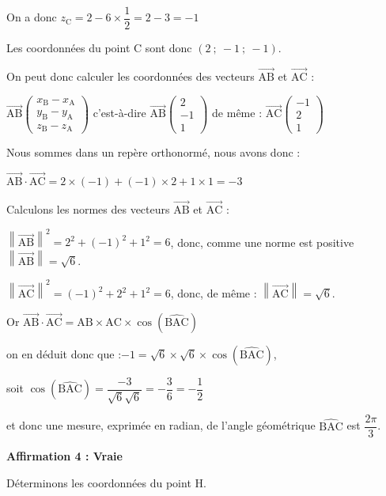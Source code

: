 \documentclass[10pt]{article}
\providecommand{\vect}[1]{\overrightarrow{#1}}
\begin{document}
On a donc $z_{\mathrm{C}}=2- 6\times \dfrac{1}{2}= 2-3=-1$

Les coordonnées du point C sont donc $(2~;~-1~;~-1)$.

On peut donc calculer les coordonnées des vecteurs $\vect{\mathrm{AB}}$ et $\vect{\mathrm{AC}}$ : 

$\vect{\mathrm{AB}}\begin{pmatrix}x_\mathrm{B} -x_\mathrm{A} \\ y_\mathrm{B}-y_\mathrm{A}\\z_\mathrm{B}-z_\mathrm{A}\end{pmatrix}$ c'est-à-dire $\vect{\mathrm{AB}}\begin{pmatrix}2 \\ -1\\1\end{pmatrix}$ 
\quad de même : $\vect{\mathrm{AC}}\begin{pmatrix}-1 \\ 2\\1\end{pmatrix}$

Nous sommes dans un repère orthonormé, nous avons donc :

$\vect {\mathrm{AB}} \cdot \vect {\mathrm{AC}}= 2 \times (-1) + (-1) \times 2 + 1 \times 1 = -3$ 

Calculons les normes des  vecteurs $\vect{\mathrm{AB}}$ et $\vect{\mathrm{AC}}$ :

$\left\|\vect {\mathrm{AB}}\right\|^2=2^2+(-1)^2+1^2=6$, donc, comme une norme est positive $\left\|\vect {\mathrm{AB}}\right\|=\sqrt{6}$.

$\left\|\vect {\mathrm{AC}}\right\|^2=(-1)^2+2^2+1^2=6$, donc, de même :
$\left\|\vect {\mathrm{AC}}\right\|=\sqrt{6}$.

Or $\vect {\mathrm{AB}} \cdot \vect {\mathrm{AC}}=\mathrm{AB} \times \mathrm{AC} \times \cos\left(\widehat{\mathrm{BAC}}\right)$

on en déduit donc que :\quad $-1=\sqrt{6} \times  \sqrt{6} \times \cos \left(\widehat{\mathrm{BAC}}\right)$,

soit \quad$\cos \left(\widehat{\mathrm{BAC}}\right)=\dfrac{-3}{\sqrt{6}\sqrt{6}}=-\dfrac{3}{6}=-\dfrac{1}{2}$

et donc une mesure, exprimée en radian, de l'angle géométrique
$\widehat{\mathrm{BAC}}$ est $\dfrac{2\pi}{3}$.

\bigskip

\textbf{Affirmation 4 : Vraie}

Déterminons les coordonnées du point H.
\end{document}
